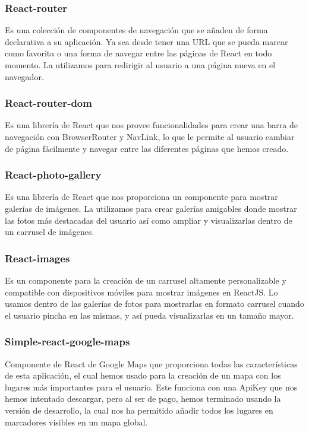 		\subsubsection*{React-router}
			Es una colección de componentes de navegación que se añaden de forma declarativa a su aplicación. Ya sea desde tener una URL que se pueda marcar como favorita o una forma de navegar entre las páginas de React en todo momento. La utilizamos para redirigir al usuario a una página nueva en el navegador.
			
 		\subsubsection*{React-router-dom}
 		  	Es una librería de React que nos provee funcionalidades para crear una barra de navegación con BrowserRouter y NavLink, lo que le permite al usuario cambiar de página fácilmente y navegar entre las diferentes páginas que hemos creado.

 		  \subsubsection*{React-photo-gallery}
 		  	Es una librería de React que nos proporciona un componente para mostrar galerías de imágenes. La utilizamos para crear galerías amigables donde mostrar las fotos más destacadas del usuario así como ampliar y visualizarlas dentro de un carrusel de imágenes.
 		  
 		  \subsubsection*{React-images}
 		  	Es un componente para la creación de un carrusel altamente personalizable y compatible con dispositivos móviles para mostrar imágenes en ReactJS. Lo usamos dentro de las galerías de fotos para mostrarlas en formato carrusel cuando el usuario pincha en las mismas, y así pueda visualizarlas en un tamaño mayor. 
 		  
 		  \subsubsection*{Simple-react-google-maps}
 		  	Componente de React de Google Maps que proporciona todas las características de esta aplicación, el cual hemos usado para la creación de un mapa con los lugares más importantes para el usuario. Este funciona con una ApiKey que nos hemos intentado descargar, pero al ser de pago, hemos terminado usando la versión de desarrollo, la cual nos ha permitido añadir todos los lugares en marcadores visibles en un mapa global.
 		  

